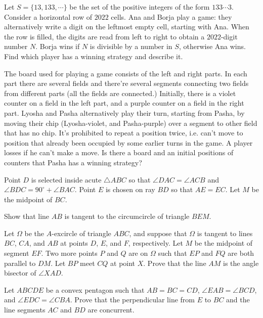 \documentclass[11pt]{scrartcl}
\begin{document}
\begin{problem}[6728439333021242021]
Let $S=\{13, 133, \cdots\}$ be the set of the positive integers of the form $133 \cdots 3$. Consider a horizontal row of $2022$ cells. Ana and Borja play a game: they alternatively write a digit on the leftmost empty cell, starting with Ana. When the row is filled, the digits are read from left to right to obtain a $2022$-digit number $N$. Borja wins if $N$ is divisible by a number in $S$, otherwise Ana wins. Find which player has a winning strategy and describe it.
\end{problem}
\begin{problem}[297728211754501]
The board used for playing a game consists of the left and right parts. In each part there are several fields and there’re several segments connecting two fields from different parts (all the fields are connected.) Initially, there is a violet counter on a field in the left part, and a purple counter on a field in the right part. Lyosha and Pasha alternatively play their turn, starting from Pasha, by moving their chip (Lyosha-violet, and Pasha-purple) over a segment to other field that has no chip. It’s prohibited to repeat a position twice, i.e. can’t move to position that already been occupied by some earlier turns in the game. A player losses if he can’t make a move. Is there a board and an initial positions of counters that Pasha has a winning strategy?
\end{problem}
\begin{problem}[978369715927760]
Point $D$ is selected inside acute $\triangle ABC$ so that $\angle DAC = \angle ACB$ and $\angle BDC = 90^{\circ} + \angle BAC$. Point $E$ is chosen on ray $BD$ so that $AE = EC$. Let $M$ be the midpoint of $BC$.

Show that line $AB$ is tangent to the circumcircle of triangle $BEM$.
\end{problem}
\begin{problem}[6566259136811987209]
	Let $\Omega$ be the $A$-excircle of triangle $ABC$, and suppose that $\Omega$ is tangent to lines $BC$, $CA$, and $AB$ at points $D$, $E$, and $F$, respectively. Let $M$ be the midpoint of segment $EF$. Two more points $P$ and $Q$ are on $\Omega$ such that $EP$ and $FQ$ are both parallel to $DM$. Let $BP$ meet $CQ$ at point $X$. Prove that the line $AM$ is the angle bisector of $\angle XAD$.
\end{problem}
\begin{problem}[7997372712267182584]
Let $ABCDE$ be a convex pentagon such that $AB=BC=CD$, $\angle{EAB}=\angle{BCD}$, and $\angle{EDC}=\angle{CBA}$. Prove that the perpendicular line from $E$ to $BC$ and the line segments $AC$ and $BD$ are concurrent.
\end{problem}
\end{document}
